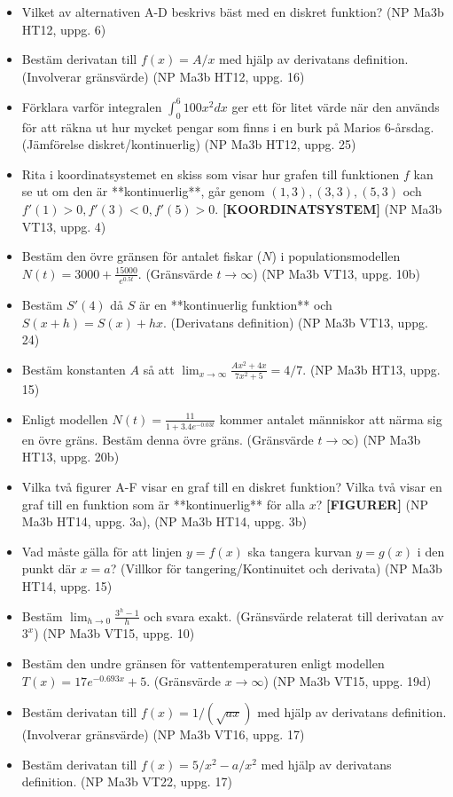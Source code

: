 \documentclass{article}
\begin{document}
\begin{itemize}
    \item Vilket av alternativen A-D beskrivs bäst med en diskret funktion? (NP Ma3b HT12, uppg. 6)
    \item Bestäm derivatan till $f(x) = A/x$ med hjälp av derivatans definition. (Involverar gränsvärde) (NP Ma3b HT12, uppg. 16)
    \item Förklara varför integralen $\int_0^6 100x^2 dx$ ger ett för litet värde när den används för att räkna ut hur mycket pengar som finns i en burk på Marios 6-årsdag. (Jämförelse diskret/kontinuerlig) (NP Ma3b HT12, uppg. 25)
    \item Rita i koordinatsystemet en skiss som visar hur grafen till funktionen $f$ kan se ut om den är **kontinuerlig**, går genom $(1, 3), (3, 3), (5, 3)$ och $f'(1)>0, f'(3)<0, f'(5)>0$. \textbf{[KOORDINATSYSTEM]} (NP Ma3b VT13, uppg. 4)
    \item Bestäm den övre gränsen för antalet fiskar ($N$) i populationsmodellen $N(t) = 3000 + \frac{15000}{e^{0.5t}}$. (Gränsvärde $t \to \infty$) (NP Ma3b VT13, uppg. 10b)
    \item Bestäm $S'(4)$ då $S$ är en **kontinuerlig funktion** och $S(x+h) = S(x) + hx$. (Derivatans definition) (NP Ma3b VT13, uppg. 24)
    \item Bestäm konstanten $A$ så att $\lim_{x \to \infty} \frac{A x^2 + 4 x}{7 x^2 + 5} = 4/7$. (NP Ma3b HT13, uppg. 15)
    \item Enligt modellen $N(t) = \frac{11}{1+3.4e^{-0.03t}}$ kommer antalet människor att närma sig en övre gräns. Bestäm denna övre gräns. (Gränsvärde $t \to \infty$) (NP Ma3b HT13, uppg. 20b)
    \item Vilka två figurer A-F visar en graf till en diskret funktion? Vilka två visar en graf till en funktion som är **kontinuerlig** för alla $x$? \textbf{[FIGURER]} (NP Ma3b HT14, uppg. 3a), (NP Ma3b HT14, uppg. 3b)
    \item Vad måste gälla för att linjen $y=f(x)$ ska tangera kurvan $y=g(x)$ i den punkt där $x=a$? (Villkor för tangering/Kontinuitet och derivata) (NP Ma3b HT14, uppg. 15)
    \item Bestäm $\lim_{h \to 0} \frac{3^h - 1}{h}$ och svara exakt. (Gränsvärde relaterat till derivatan av $3^x$) (NP Ma3b VT15, uppg. 10)
    \item Bestäm den undre gränsen för vattentemperaturen enligt modellen $T(x) = 17e^{-0.693x} + 5$. (Gränsvärde $x \to \infty$) (NP Ma3b VT15, uppg. 19d)
    \item Bestäm derivatan till $f(x) = 1/(\sqrt{ax})$ med hjälp av derivatans definition. (Involverar gränsvärde) (NP Ma3b VT16, uppg. 17)
    \item Bestäm derivatan till $f(x) = 5/x^2 - a/x^2$ med hjälp av derivatans definition. (NP Ma3b VT22, uppg. 17)
\end{itemize}
\end{document}
